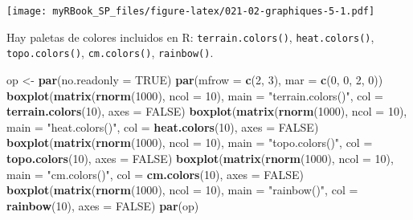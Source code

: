 \documentclass[
]{book}
\newenvironment{Shaded}{\begin{snugshade}}{\end{snugshade}}
\newcommand{\DataTypeTok}[1]{\textcolor[rgb]{0.13,0.29,0.53}{#1}}
\newcommand{\DecValTok}[1]{\textcolor[rgb]{0.00,0.00,0.81}{#1}}
\newcommand{\KeywordTok}[1]{\textcolor[rgb]{0.13,0.29,0.53}{\textbf{#1}}}
\newcommand{\NormalTok}[1]{#1}
\newcommand{\OtherTok}[1]{\textcolor[rgb]{0.56,0.35,0.01}{#1}}
\newcommand{\StringTok}[1]{\textcolor[rgb]{0.31,0.60,0.02}{#1}}
\begin{document}
\texttt{[image: myRBook\_SP\_files/figure-latex/021-02-graphiques-5-1.pdf]}

Hay paletas de colores incluidos en R: \texttt{terrain.colors()}, \texttt{heat.colors()}, \texttt{topo.colors()},
\texttt{cm.colors()}, \texttt{rainbow()}.

\begin{Shaded}
\begin{Highlighting}[]
\NormalTok{op <-}\StringTok{ }\KeywordTok{par}\NormalTok{(}\DataTypeTok{no.readonly =} \OtherTok{TRUE}\NormalTok{)}
\KeywordTok{par}\NormalTok{(}\DataTypeTok{mfrow =} \KeywordTok{c}\NormalTok{(}\DecValTok{2}\NormalTok{, }\DecValTok{3}\NormalTok{), }\DataTypeTok{mar =} \KeywordTok{c}\NormalTok{(}\DecValTok{0}\NormalTok{, }\DecValTok{0}\NormalTok{, }\DecValTok{2}\NormalTok{, }\DecValTok{0}\NormalTok{))}
\KeywordTok{boxplot}\NormalTok{(}\KeywordTok{matrix}\NormalTok{(}\KeywordTok{rnorm}\NormalTok{(}\DecValTok{1000}\NormalTok{), }\DataTypeTok{ncol =} \DecValTok{10}\NormalTok{), }\DataTypeTok{main =} \StringTok{"terrain.colors()"}\NormalTok{, }
        \DataTypeTok{col =} \KeywordTok{terrain.colors}\NormalTok{(}\DecValTok{10}\NormalTok{), }\DataTypeTok{axes =} \OtherTok{FALSE}\NormalTok{)}
\KeywordTok{boxplot}\NormalTok{(}\KeywordTok{matrix}\NormalTok{(}\KeywordTok{rnorm}\NormalTok{(}\DecValTok{1000}\NormalTok{), }\DataTypeTok{ncol =} \DecValTok{10}\NormalTok{), }\DataTypeTok{main =} \StringTok{"heat.colors()"}\NormalTok{, }
        \DataTypeTok{col =} \KeywordTok{heat.colors}\NormalTok{(}\DecValTok{10}\NormalTok{), }\DataTypeTok{axes =} \OtherTok{FALSE}\NormalTok{)}
\KeywordTok{boxplot}\NormalTok{(}\KeywordTok{matrix}\NormalTok{(}\KeywordTok{rnorm}\NormalTok{(}\DecValTok{1000}\NormalTok{), }\DataTypeTok{ncol =} \DecValTok{10}\NormalTok{), }\DataTypeTok{main =} \StringTok{"topo.colors()"}\NormalTok{, }
        \DataTypeTok{col =} \KeywordTok{topo.colors}\NormalTok{(}\DecValTok{10}\NormalTok{), }\DataTypeTok{axes =} \OtherTok{FALSE}\NormalTok{)}
\KeywordTok{boxplot}\NormalTok{(}\KeywordTok{matrix}\NormalTok{(}\KeywordTok{rnorm}\NormalTok{(}\DecValTok{1000}\NormalTok{), }\DataTypeTok{ncol =} \DecValTok{10}\NormalTok{), }\DataTypeTok{main =} \StringTok{"cm.colors()"}\NormalTok{, }
        \DataTypeTok{col =} \KeywordTok{cm.colors}\NormalTok{(}\DecValTok{10}\NormalTok{), }\DataTypeTok{axes =} \OtherTok{FALSE}\NormalTok{)}
\KeywordTok{boxplot}\NormalTok{(}\KeywordTok{matrix}\NormalTok{(}\KeywordTok{rnorm}\NormalTok{(}\DecValTok{1000}\NormalTok{), }\DataTypeTok{ncol =} \DecValTok{10}\NormalTok{), }\DataTypeTok{main =} \StringTok{"rainbow()"}\NormalTok{, }
        \DataTypeTok{col =} \KeywordTok{rainbow}\NormalTok{(}\DecValTok{10}\NormalTok{), }\DataTypeTok{axes =} \OtherTok{FALSE}\NormalTok{)}
\KeywordTok{par}\NormalTok{(op)}
\end{Highlighting}
\end{Shaded}
\end{document}
